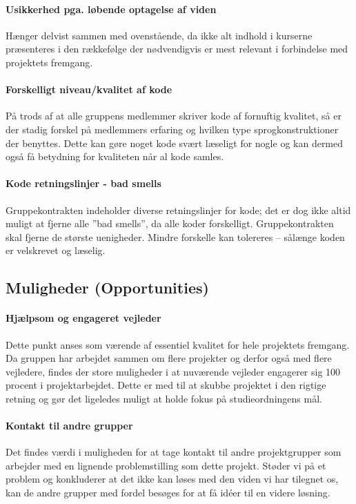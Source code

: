 \paragraph{Usikkerhed pga. løbende optagelse af viden}\label{swot:optagelse_af_viden}
Hænger delvist sammen med ovenstående, da ikke alt indhold i kurserne præsenteres i den rækkefølge der nødvendigvis er mest relevant i forbindelse med projektets fremgang.

\paragraph{Forskelligt niveau/kvalitet af kode}\label{swot:niveau_af_kode}
På trods af at alle gruppens medlemmer skriver kode af fornuftig kvalitet, så er der stadig forskel på medlemmers erfaring og hvilken type sprogkonstruktioner der benyttes.
Dette kan gøre noget kode svært læseligt for nogle og kan dermed også få betydning for kvaliteten når al kode samles.

\paragraph{Kode retningslinjer - bad smells}\label{swot:bad_smells}
Gruppekontrakten indeholder diverse retningslinjer for kode; det er dog ikke altid muligt at fjerne alle ''bad smells'', da alle koder forskelligt.
Gruppekontrakten skal fjerne de største uenigheder.
Mindre forskelle kan tolereres -- sålænge koden er velskrevet og læselig.

\subsection{Muligheder \textnormal{(\textbf{O}pportunities)}}

\paragraph{Hjælpsom og engageret vejleder}
Dette punkt anses som værende af essentiel kvalitet for hele projektets fremgang. 
Da gruppen har arbejdet sammen om flere projekter og derfor også med flere vejledere, findes der store muligheder i at nuværende vejleder engagerer sig 100 procent i projektarbejdet.
Dette er med til at skubbe projektet i den rigtige retning og gør det ligeledes muligt at holde fokus på studieordningens mål.

\paragraph{Kontakt til andre grupper}
Det findes værdi i muligheden for at tage kontakt til andre projektgrupper som arbejder med en lignende problemstilling som dette projekt.
Støder vi på et problem og konkluderer at det ikke kan løses med den viden vi har tilegnet os, kan de andre grupper med fordel besøges for at få idéer til en videre løsning.

